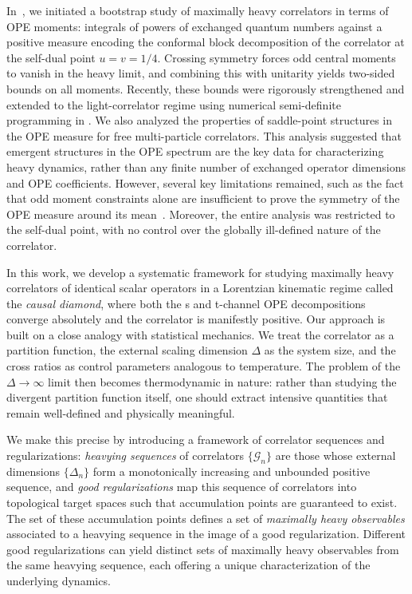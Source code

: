 \documentclass[a4paper,11pt]{article}
\theoremstyle{plain}
\theoremstyle{definition}
\theoremstyle{remark}
\newcommand{\De}{\Delta}
\begin{document}
In~\cite{Poland:2024hvb}, we initiated a bootstrap study of maximally heavy correlators in terms of OPE moments: integrals of powers of exchanged quantum numbers against a positive measure encoding the conformal block decomposition of the correlator at the self-dual point $u = v = 1/4$. Crossing symmetry forces odd central moments to vanish in the heavy limit, and combining this with unitarity yields two-sided bounds on all moments. Recently, these bounds were rigorously strengthened and extended to the light-correlator regime using numerical semi-definite programming in \cite{Chiang:2026nmd}. We also analyzed the properties of saddle-point structures in the OPE measure for free multi-particle correlators. This analysis suggested that emergent structures in the OPE spectrum are the key data for characterizing heavy dynamics, rather than any finite number of exchanged operator dimensions and OPE coefficients. However, several key limitations remained, such as the fact that odd moment constraints alone are insufficient to prove the symmetry of the OPE measure around its mean~\cite{churchill1}. Moreover, the entire analysis was restricted to the self-dual point, with no control over the globally ill-defined nature of the correlator.

In this work, we develop a systematic framework for studying maximally heavy correlators of identical scalar operators in a Lorentzian kinematic regime called the \textit{causal diamond}, where both the s and t-channel OPE decompositions converge absolutely and the correlator is manifestly positive. Our approach is built on a close analogy with statistical mechanics. We treat the correlator as a partition function, the external scaling dimension $\De$ as the system size, and the cross ratios as control parameters analogous to temperature. The problem of the $\De \to \infty$ limit then becomes thermodynamic in nature: rather than studying the divergent partition function itself, one should extract intensive quantities that remain well-defined and physically meaningful.

We make this precise by introducing a framework of correlator sequences and regularizations: \textit{heavying sequences} of correlators $\{\mathcal{G}_n\}$ are those whose external dimensions $\{\De_n\}$ form a monotonically increasing and unbounded positive sequence, and \textit{good regularizations} map this sequence of correlators into topological target spaces such that accumulation points are guaranteed to exist. The set of these accumulation points defines a set of \textit{maximally heavy observables} associated to a heavying sequence in the image of a good regularization. Different good regularizations can yield distinct sets of maximally heavy observables from the same heavying sequence, each offering a unique characterization of the underlying dynamics. 
\end{document}
